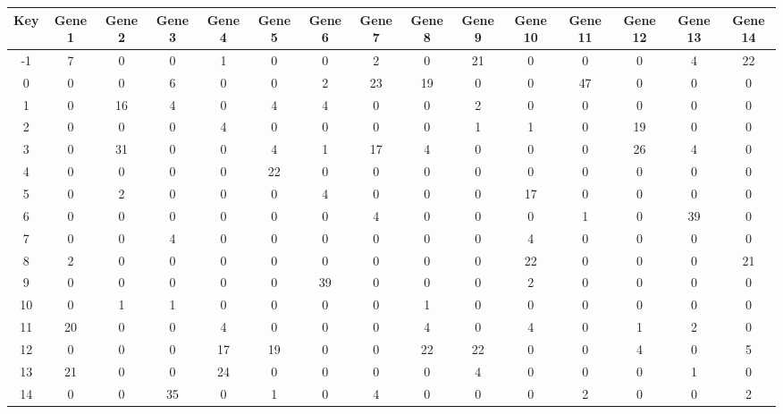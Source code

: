 \begin{tabular}{|c|c|c|c|c|c|c|c|c|c|c|c|c|c|c|}
\hline
Key & Gene 1 & Gene 2 & Gene 3 & Gene 4 & Gene 5 & Gene 6 & Gene 7 & Gene 8 & Gene 9 & Gene 10 & Gene 11 & Gene 12 & Gene 13 & Gene 14 \\
\hline
-1 & 7 & 0 & 0 & 1 & 0 & 0 & 2 & 0 & 21 & 0 & 0 & 0 & 4 & 22 \\
0 & 0 & 0 & 6 & 0 & 0 & 2 & 23 & 19 & 0 & 0 & 47 & 0 & 0 & 0 \\
1 & 0 & 16 & 4 & 0 & 4 & 4 & 0 & 0 & 2 & 0 & 0 & 0 & 0 & 0 \\
2 & 0 & 0 & 0 & 4 & 0 & 0 & 0 & 0 & 1 & 1 & 0 & 19 & 0 & 0 \\
3 & 0 & 31 & 0 & 0 & 4 & 1 & 17 & 4 & 0 & 0 & 0 & 26 & 4 & 0 \\
4 & 0 & 0 & 0 & 0 & 22 & 0 & 0 & 0 & 0 & 0 & 0 & 0 & 0 & 0 \\
5 & 0 & 2 & 0 & 0 & 0 & 4 & 0 & 0 & 0 & 17 & 0 & 0 & 0 & 0 \\
6 & 0 & 0 & 0 & 0 & 0 & 0 & 4 & 0 & 0 & 0 & 1 & 0 & 39 & 0 \\
7 & 0 & 0 & 4 & 0 & 0 & 0 & 0 & 0 & 0 & 4 & 0 & 0 & 0 & 0 \\
8 & 2 & 0 & 0 & 0 & 0 & 0 & 0 & 0 & 0 & 22 & 0 & 0 & 0 & 21 \\
9 & 0 & 0 & 0 & 0 & 0 & 39 & 0 & 0 & 0 & 2 & 0 & 0 & 0 & 0 \\
10 & 0 & 1 & 1 & 0 & 0 & 0 & 0 & 1 & 0 & 0 & 0 & 0 & 0 & 0 \\
11 & 20 & 0 & 0 & 4 & 0 & 0 & 0 & 4 & 0 & 4 & 0 & 1 & 2 & 0 \\
12 & 0 & 0 & 0 & 17 & 19 & 0 & 0 & 22 & 22 & 0 & 0 & 4 & 0 & 5 \\
13 & 21 & 0 & 0 & 24 & 0 & 0 & 0 & 0 & 4 & 0 & 0 & 0 & 1 & 0 \\
14 & 0 & 0 & 35 & 0 & 1 & 0 & 4 & 0 & 0 & 0 & 2 & 0 & 0 & 2 \\
\hline
\end{tabular}